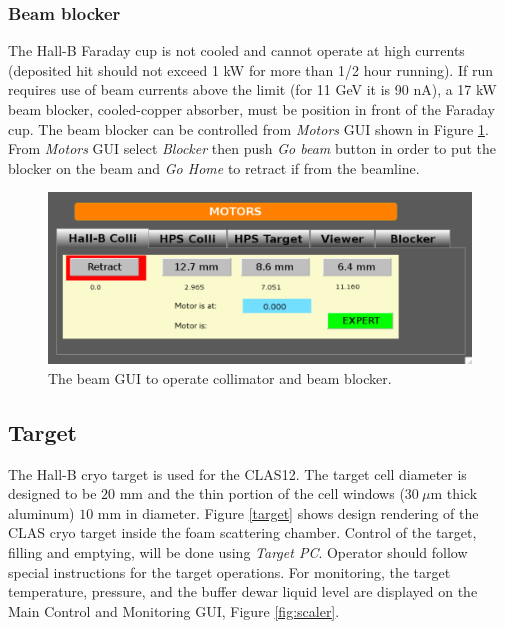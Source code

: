 \documentclass[12pt]{article}
\begin{document}
\subsubsection{Beam blocker}
\label{subsec:blocker}
\indent

The Hall-B Faraday cup is not cooled and cannot operate at high currents (deposited hit should not exceed 1 kW for more than 1/2 hour running). If run requires use of beam currents above the limit (for 11 GeV it is 90 nA), a 17 kW beam blocker, cooled-copper absorber, must be position in front of the Faraday cup. The beam blocker can be controlled from {\it Motors} GUI shown in Figure \ref{fig:beamblocker}.  From {\it Motors} GUI select {\it Blocker} then push {\it Go beam} button  in order to put the blocker on the beam and {\it Go Home} to retract if from the beamline. 

\begin{figure}[tbhp]
{\centering \includegraphics[scale=0.65]{collimator.pdf} \par}
\caption{The beam GUI to operate collimator and beam blocker. \label{fig:beamblocker}}
\end{figure}


\clearpage

\subsection{\bf Target}
\indent

The Hall-B cryo target is used for the CLAS12. The target cell diameter is designed to be $20$ mm and the thin portion of the cell windows ($30~\mu$m thick aluminum) $10$ mm in diameter. Figure \ref{target} shows design rendering of the CLAS cryo target inside the foam scattering chamber. Control of the target, filling and emptying, will be done using {\it Target PC}. Operator should follow special instructions for the target operations. For monitoring, the target temperature, pressure, and the buffer dewar liquid level are displayed on the Main Control and Monitoring GUI, Figure \ref{fig:scaler}. 
\end{document}

